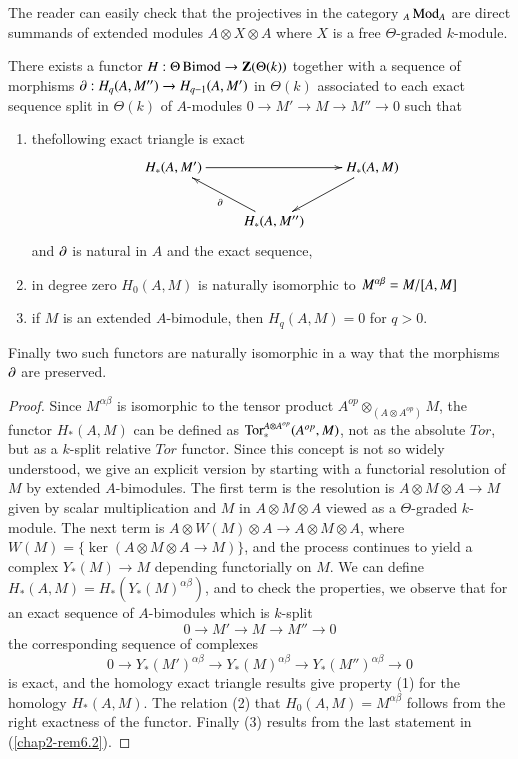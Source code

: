 The reader can easily check that the projectives in the category
${}_{A}\break\Mod_{A}$ are direct summands of extended modules $A\otimes
X\otimes A$ where $X$ is a free $\Theta$-graded $k$-module.

\begin{theorem}\label{chap2-thm6.3}
There exists a functor $H:\Theta\operatorname{Bimod}\to \mathbf{Z}(\Theta(k))$ together
with a sequence of morphisms $\partial:H_{q}(A,M'')\to H_{q-1}(A,M')$ in
$\Theta(k)$ associated to each exact sequence split in $\Theta(k)$ of
$A$-modules $0\to M'\to M\to M''\to 0$ such that 
\begin{enumerate}
\renewcommand{\labelenumi}{\rm(\theenumi)}
\item the\pageoriginale following exact triangle is exact
\[
\xymatrix{
H_{\ast}(A,M')\ar[rr] & & H_{\ast}(A,M)\ar[dl]\\
 & H_{\ast}(A,M'')\ar[ul]^{\p} & 
}
\]
and $\partial$ is natural in $A$ and the exact sequence,

\item in degree zero $H_{0}(A,M)$ is naturally isomorphic to
  $M^{\alpha\beta}= M/[A,\break M]$ 

\item if $M$ is an extended $A$-bimodule, then $H_{q}(A,M)=0$ for
  $q>0$. 
\end{enumerate}

Finally two such functors are naturally isomorphic in a way that the
morphisms $\partial$ are preserved.
\end{theorem}

\begin{proof}
Since $M^{\alpha\beta}$ is isomorphic to the tensor product
$A^{op}\otimes_{(A\otimes A^{op})}M$, the functor $H_{\ast}(A,M)$ can
be defined as $\operatorname{Tor}^{A\otimes A^{op}}_{\ast}(A^{op},M)$, not as the
absolute $Tor$, but as a $k$-split relative $Tor$ functor. Since
this concept is not so widely understood, we give an explicit version
by starting with a functorial resolution of $M$ by extended
$A$-bimodules. The first term is the resolution is $A\otimes M\otimes
A\to M$ given by scalar multiplication and $M$ in $A\otimes M\otimes
A$ viewed as a $\Theta$-graded $k$-module. The next term is $A\otimes
W(M)\otimes A\to A\otimes M\otimes A$, where $W(M)=\{\ker(A\otimes
M\otimes A\to M)\}$, and the process continues to yield a complex
$Y_{\ast}(M)\to M$ depending functorially on $M$. We can define
$H_{\ast}(A,M)=H_{\ast}(Y_{\ast}(M)^{\alpha\beta})$, and to check the
properties, we observe that for an exact sequence of $A$-bimodules
which is $k$-split
$$
0\to M'\to M\to M''\to 0
$$
the corresponding sequence of complexes
$$
0\to Y_{\ast}(M')^{\alpha\beta}\to Y_{\ast}(M)^{\alpha\beta}\to
Y_{\ast}(M'')^{\alpha\beta}\to 0
$$
is exact, and the homology exact triangle results give property (1)
for the homology $H_{\ast}(A,M)$. The relation (2) that
$H_{0}(A,M)=M^{\alpha\beta}$ follows from the\pageoriginale 
right exactness of the
functor. Finally (3) results from the last statement in
(\ref{chap2-rem6.2}). 
\end{proof}

